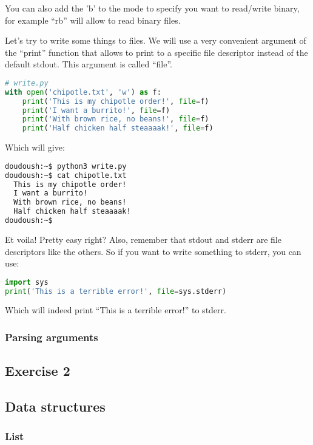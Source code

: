 You can also add the 'b' to the mode to specify you want to read/write binary, for example ``rb'' will
allow to read binary files.

\vspace{5mm}
Let's try to write some things to files. We will use a very convenient argument of the
``print'' function that allows to print to a specific file descriptor instead of the
default stdout. This argument is called ``file''.

\begin{lstlisting}[language=python]
# write.py
with open('chipotle.txt', 'w') as f:
    print('This is my chipotle order!', file=f)
    print('I want a burrito!', file=f)
    print('With brown rice, no beans!', file=f)
    print('Half chicken half steaaaak!', file=f)
\end{lstlisting}

Which will give:
\begin{lstlisting}[language=bash]
doudoush:~$ python3 write.py
doudoush:~$ cat chipotle.txt
  This is my chipotle order!
  I want a burrito!
  With brown rice, no beans!
  Half chicken half steaaaak!
doudoush:~$
\end{lstlisting}

Et voila! Pretty easy right? Also, remember that stdout and stderr are file
descriptors like the others. So if you want to write something to stderr,
you can use:

\begin{lstlisting}[language=python]
import sys
print('This is a terrible error!', file=sys.stderr)
\end{lstlisting}

Which will indeed print ``This is a terrible error!'' to stderr.

\subsubsection{Parsing arguments}

\subsection{Exercise 2}

\subsection{Data structures}
\subsubsection{List}
